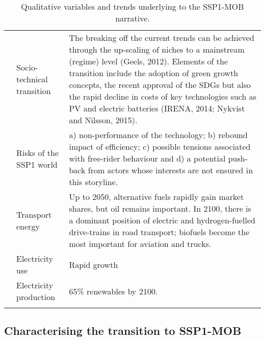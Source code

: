 {\begin{longtable}{p{3cm}p{3.5cm}p{8cm}}
\textit{} & Socio-technical transition & The breaking off the current trends can be achieved through the up-scaling of niches to a mainstream (regime) level (Geels, 2012). Elements of the transition include the adoption of green growth concepts, the recent approval of the SDGs but also the rapid decline in costs of key technologies such as PV and electric batteries (IRENA, 2014; Nykvist and Nilsson, 2015).\\
\textit{} & Risks of the SSP1 world & a) non-performance of the technology; b) rebound impact of efficiency; c) possible tensions associated with free-rider behaviour and d) a potential push-back from actors whose interests are not ensured in this storyline.\\
\textit{} & Transport energy & Up to 2050, alternative fuels rapidly gain market shares, but oil remains important. In 2100, there is a dominant position of electric and hydrogen-fuelled drive-trains in road transport; biofuels become the most important for aviation and trucks.\\
\textit{} & Electricity use & Rapid growth\\
\textit{} & Electricity production & 65\% renewables by 2100.\\ \bottomrule
\caption{Qualitative variables and trends underlying to the \gls{SSP1-MOB} narrative.}
\label{t:ssp1-mob-narrative-vars}
\end{longtable}
}

\subsection{Characterising the transition to SSP1-MOB}
\label{ss:results:ssp1-mob-transition-char}

